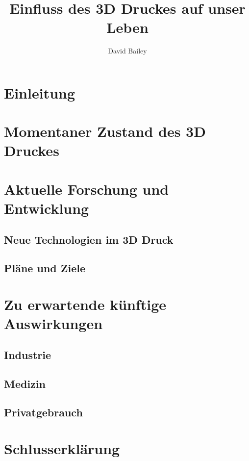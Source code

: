 \documentclass[11pt,a4paper]{article}
\author{David Bailey}
\title{Einfluss des 3D Druckes auf unser Leben}
\begin{document}
\onehalfspacing



\pagestyle{empty}
\tableofcontents

\newpage
\section{Einleitung}

\newpage
\section{Momentaner Zustand des 3D Druckes}


\newpage
\section{Aktuelle Forschung und Entwicklung}
\subsection{Neue Technologien im 3D Druck}
\subsection{Pläne und Ziele}

\newpage
\section{Zu erwartende künftige Auswirkungen}
\subsection{Industrie}
\subsection{Medizin}
\subsection{Privatgebrauch}


\newpage

\printbibliography[heading=bibintoc]

\section*{Schlusserklärung}
\end{document}
